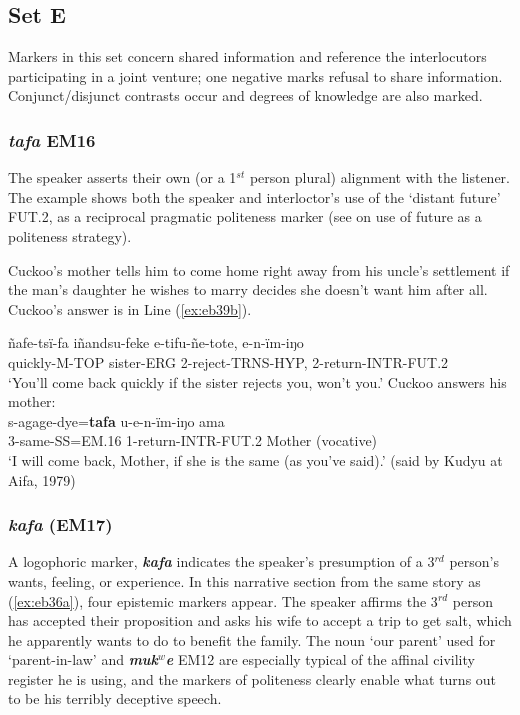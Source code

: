 \documentclass[output=paper]{langsci/langscibook}
\begin{document}
\subsection{Set E}

Markers in this set concern shared information and reference the interlocutors participating in a joint venture; one negative marks refusal to share information. Conjunct/disjunct contrasts occur and degrees of knowledge are also marked.

\subsubsection{\textit{tafa} EM16} 
The speaker asserts their own (or a 1$^{st}$ person plural) alignment with the listener. The example shows both the speaker and interloctor’s use of the ‘distant future’ FUT.2, %
as a reciprocal pragmatic politeness marker (see \citealt{Mendoza2016} on use of future as a politeness strategy). 

Cuckoo’s mother tells him to come home right away from his uncle’s settlement if the man’s  daughter he wishes to marry decides she doesn’t want him after all. Cuckoo’s answer is in Line (\ref{ex:eb39b}).

\begin{exe}
\ex \label{ex:eb39}
	\begin{xlist}
	\ex \label{ex:eb39a}
	\gll ñafe-tsï-fa iñandsu-feke e-tifu-ñe-tote, e-n-ïm-iŋo\\
	quickly-M-TOP sister-ERG 2-reject-TRNS-HYP, 2-return-INTR-FUT.2\\
	\trans ‘You’ll come back quickly if the sister rejects you, won’t you.’
	\ex Cuckoo answers his mother:\label{ex:eb39b}\\ 
	\gll s-agage-dye=\textbf{tafa} u-e-n-ïm-iŋo ama\\
	3-same-SS=EM.16 1-return-INTR-FUT.2 Mother (vocative)\\
	\trans ‘I will come back, Mother, if she is the same (as you've said).’ (said by Kudyu at Aifa, 1979)
\end{xlist}
\end{exe}

\subsubsection{\textit{kafa} (EM17)} 
A logophoric marker, \textbf{\textit{kafa}} indicates the speaker’s presumption of a 3$^{rd}$ person’s wants,  feeling, or experience.   In this narrative section from the same story as (\ref{ex:eb36a}), four epistemic markers appear.  The speaker  affirms the 3$^{rd}$ person has accepted their proposition and asks his wife to accept a trip to get salt, which he apparently wants to do to benefit the family.  The noun ‘our parent’ used for ‘parent-in-law’ and \textbf{\textit{muk$^w$e}} EM12 are especially typical of the affinal civility register he is using, and the markers of politeness clearly enable what turns out to be his terribly deceptive speech. 
\end{document}

